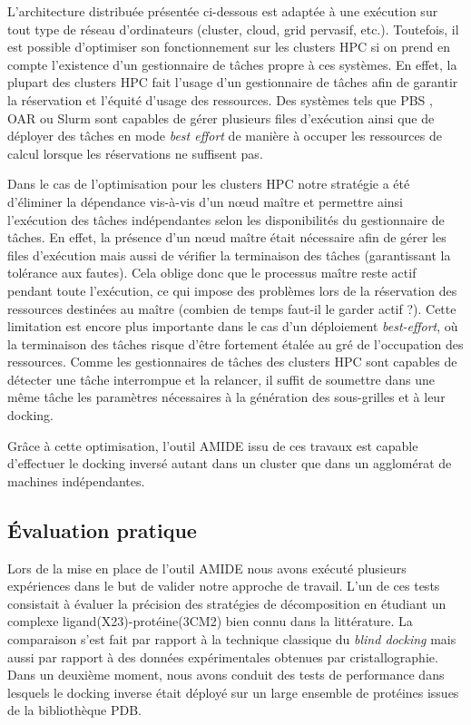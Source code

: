  L'architecture distribuée présentée ci-dessous est adaptée à une exécution sur tout type de réseau d'ordinateurs (cluster, cloud, grid pervasif, etc.). Toutefois, il est possible d'optimiser son fonctionnement sur les clusters HPC si on prend en compte l'existence d'un gestionnaire de tâches propre à ces systèmes. En effet, la plupart des clusters HPC fait l'usage d'un gestionnaire de tâches afin de garantir la réservation et l'équité d'usage des ressources. Des systèmes tels que PBS \cite{Henderson95}, OAR \cite{Capit2005} ou Slurm \cite{Yoo2003} sont capables de gérer plusieurs files d'exécution ainsi que de déployer des tâches en mode \textit{best effort} de manière à occuper les ressources de calcul lorsque les réservations ne suffisent pas. 
 
 Dans le cas de l'optimisation pour les clusters HPC notre stratégie a été d'éliminer la dépendance vis-à-vis d'un n{\oe}ud maître et permettre ainsi l'exécution des tâches indépendantes selon les disponibilités du gestionnaire de tâches. En effet, la présence d'un n{\oe}ud maître était nécessaire afin de gérer les files d'exécution mais aussi de vérifier la terminaison des tâches (garantissant la tolérance aux fautes). Cela oblige donc que le processus maître reste actif pendant toute l'exécution, ce qui impose des problèmes lors de la réservation des ressources destinées au maître (combien de temps faut-il le garder actif ?). Cette limitation est encore plus importante dans le cas d'un déploiement \textit{best-effort}, où la terminaison des tâches risque d'être fortement étalée au gré de l'occupation des ressources. Comme les gestionnaires de tâches des clusters HPC sont capables de détecter une tâche interrompue et la relancer, il suffit de soumettre dans une même tâche les paramètres nécessaires à la génération des sous-grilles et à leur docking. 
 
 Grâce à cette optimisation, l'outil AMIDE issu de ces travaux est capable d'effectuer le docking inversé autant dans un cluster que dans un agglomérat de machines indépendantes.
 
 \subsection{Évaluation pratique}
 
 Lors de la mise en place de l'outil AMIDE nous avons exécuté plusieurs expériences dans le but de valider notre approche de travail. L'un de ces tests consistait à évaluer la précision des stratégies de décomposition en étudiant un complexe ligand(X23)-protéine(3CM2) bien connu dans la littérature. La comparaison s'est fait par rapport à la technique classique du \textit{blind docking} mais aussi par rapport à des données expérimentales obtenues par cristallographie. Dans un deuxième moment, nous avons conduit des tests de performance dans lesquels le docking inverse était déployé sur un large ensemble de protéines issues de la bibliothèque PDB.
 

